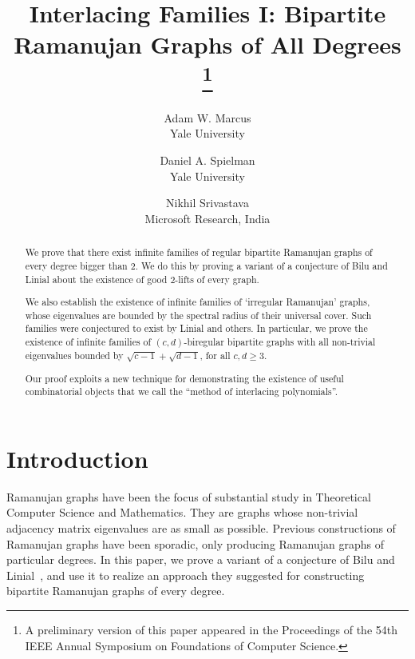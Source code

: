 \documentclass[11pt]{article}
\begin{document}
\title{
Interlacing Families I: Bipartite Ramanujan Graphs of All Degrees
\thanks{
A preliminary version of this paper appeared in the Proceedings of the
54th IEEE Annual Symposium on Foundations of Computer Science.
}}

\author{
Adam W. Marcus\\
Yale University\\
\and
Daniel A. Spielman \\ 
Yale University
\and 
Nikhil Srivastava\\
Microsoft Research, 
India
}


\maketitle


\begin{abstract}
We prove that there exist infinite families of regular bipartite Ramanujan graphs
  of every degree bigger than $2$.
We do this by proving a variant of a conjecture of Bilu and Linial
  about the existence of good $2$-lifts of every graph.

We also establish the existence of infinite families of `irregular Ramanujan' graphs, whose
  eigenvalues are bounded by the spectral radius of their universal cover. Such
  families were conjectured to exist by Linial and others.
In particular, we prove the existence of infinite families of $(c,d)$-biregular bipartite graphs
  with all non-trivial eigenvalues bounded by $\sqrt{c-1}+\sqrt{d-1}$, for all $c, d \geq 3$.

Our proof exploits a new technique for demonstrating the existence
  of useful combinatorial objects that we call the ``method of interlacing polynomials''.
\end{abstract}




\section{Introduction}\label{sec:intro}

Ramanujan graphs have been the focus of substantial study in Theoretical Computer Science
  and Mathematics.
They are graphs whose non-trivial adjacency matrix eigenvalues are as small as possible.
Previous constructions of Ramanujan graphs have been sporadic, only producing Ramanujan
  graphs of particular degrees.
In this paper, we prove a variant of a conjecture of Bilu and Linial~\cite{BiluLinial},
  and use it to realize an approach they suggested for constructing bipartite
  Ramanujan graphs of every degree.
\end{document}
